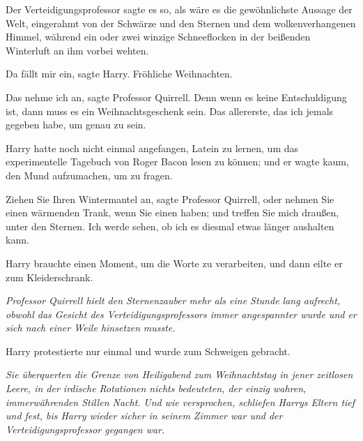 Der Verteidigungsprofessor sagte es so, als wäre es die gewöhnlichste Aussage
der Welt, eingerahmt von der Schwärze und den Sternen und dem wolkenverhangenen
Himmel, während ein oder zwei winzige Schneeflocken in der beißenden Winterluft
an ihm vorbei wehten.

\glqq{}Da fällt mir ein\grqq{}, sagte Harry. \glqq{}Fröhliche Weihnachten.\grqq{}

\glqq{}Das nehme ich an\grqq{}, sagte Professor Quirrell. \glqq{}Denn wenn es
keine Entschuldigung ist, dann muss es ein Weihnachtsgeschenk sein. Das
allererste, das ich jemals gegeben habe, um genau zu sein.\grqq{}

Harry hatte noch nicht einmal angefangen, Latein zu lernen, um das
experimentelle Tagebuch von Roger Bacon lesen zu können; und er wagte kaum, den
Mund aufzumachen, um zu fragen.

\glqq{}Ziehen Sie Ihren Wintermantel an\grqq{}, sagte Professor Quirrell, \glqq{}
oder nehmen Sie einen wärmenden Trank, wenn Sie einen haben; und treffen Sie
mich draußen, unter den Sternen. Ich werde sehen, ob ich es diesmal etwas länger
aushalten kann.\grqq{}

Harry brauchte einen Moment, um die Worte zu verarbeiten, und dann eilte er zum
Kleiderschrank.

\emph{Professor Quirrell hielt den Sternenzauber mehr als eine Stunde lang
aufrecht, obwohl das Gesicht des Verteidigungsprofessors immer angespannter
wurde und er sich nach einer Weile hinsetzen} \emph{musste.}

Harry protestierte nur einmal und wurde zum Schweigen gebracht.

\emph{Sie überquerten die Grenze von Heiligabend zum Weihnachtstag in jener
zeitlosen Leere, in der irdische Rotationen nichts bedeuteten, der einzig
wahren, immerwährenden Stillen Nacht.}\emph{ Und wie versprochen, schliefen
Harrys Eltern tief und fest, bis Harry wieder sicher in seinem Zimmer war und
der Verteidigungsprofessor gegangen war.}

